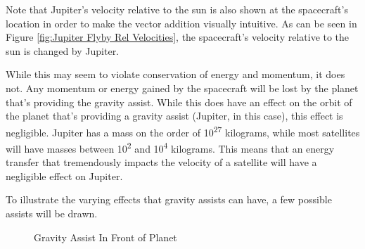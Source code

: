 \documentclass[../main.tex]{subfiles}
\begin{document}
Note that Jupiter's velocity relative to the sun is also shown at the spacecraft's location in order to make the vector addition visually intuitive. As can be seen in Figure \ref{fig:Jupiter Flyby Rel Velocities}, the spacecraft's velocity relative to the sun is changed by Jupiter.

While this may seem to violate conservation of energy and momentum, it does not. Any momentum or energy gained by the spacecraft will be lost by the planet that's providing the gravity assist. While this does have an effect on the orbit of the planet that's providing a gravity assist (Jupiter, in this case), this effect is negligible. Jupiter has a mass on the order of 10\textsuperscript{27} kilograms, while most satellites will have masses between 10\textsuperscript{2} and 10\textsuperscript{4} kilograms. This means that an energy transfer that tremendously impacts the velocity of a satellite will have a negligible effect on Jupiter.

To illustrate the varying effects that gravity assists can have, a few possible assists will be drawn.

\begin{figure}[H]
    \centering
    \caption{Gravity Assist In Front of Planet}\label{fig:Gravity Assist Ahead of Planet}
\end{figure}
\end{document}
